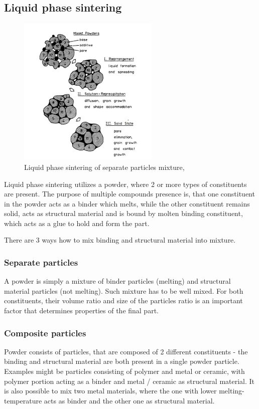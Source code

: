 \documentclass[a4paper, twoside, 11pt]{report}
\begin{document}
\subsection{Liquid phase sintering}
\begin{figure}
 	\includegraphics[width=0.6\textwidth]{liquidPhaseSintering}
	\caption{Liquid phase sintering of separate particles mixture, \cite[p. 6]{LPS}}
\end{figure}
Liquid phase sintering utilizes a powder, where 2 or more types of constituents are present. The purpose of multiple compounds presence is, that one constituent in the powder acts as a binder which melts, while the other constituent remains solid, acts as structural material  and is bound by molten binding constituent, which acts as a glue to hold and form the part.

	There are 3 ways how to mix binding and structural material into mixture.
	
\subsubsection{Separate particles}
A powder is simply a mixture of binder particles (melting) and structural material particles (not melting). Such mixture has to be well mixed. For both constituents, their volume ratio and size of the particles ratio is an important factor that determines properties of the final part.
\subsubsection{Composite particles}
Powder consists of particles, that are composed of 2 different constituents - the binding and structural material are both present in a single powder particle. Examples might be particles consisting of polymer and metal or ceramic, with polymer portion acting as a binder and metal / ceramic as structural material. It is also possible to mix two metal materials, where the one with lower melting-temperature acts as binder and the other one as structural material.
\end{document}
